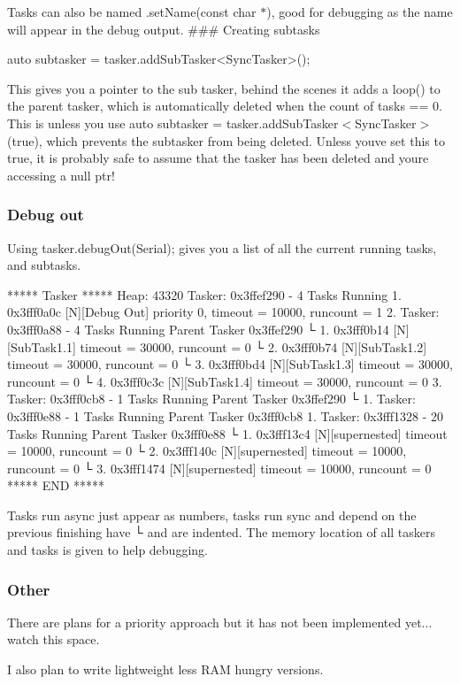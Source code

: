 Tasks can also be named {\ttfamily .set\+Name(const char $\ast$)}, good for debugging as the name will appear in the debug output. \#\#\# Creating subtasks 
\begin{DoxyCode}
auto subtasker = tasker.addSubTasker<SyncTasker>();
\end{DoxyCode}
 This gives you a pointer to the sub tasker, behind the scenes it adds a loop() to the parent tasker, which is automatically deleted when the count of tasks == 0. This is unless you use {\ttfamily auto subtasker = tasker.\+add\+Sub\+Tasker$<$Sync\+Tasker$>$(true)}, which prevents the subtasker from being deleted. Unless you\textquotesingle{}ve set this to true, it is probably safe to assume that the tasker has been deleted and you\textquotesingle{}re accessing a null ptr!

\subsubsection*{Debug out}

Using {\ttfamily tasker.\+debug\+Out(\+Serial);} gives you a list of all the current running tasks, and subtasks. 
\begin{DoxyCode}
*****  Tasker  *****  
Heap: 43320
Tasker: 0x3ffef290 - 4 Tasks Running
    1. 0x3fff0a0c [N][Debug Out] priority 0, timeout = 10000, runcount = 1
    2. Tasker: 0x3fff0a88 - 4 Tasks Running Parent Tasker 0x3ffef290
       └ 1. 0x3fff0b14 [N][SubTask1.1] timeout = 30000, runcount = 0
        └ 2. 0x3fff0b74 [N][SubTask1.2] timeout = 30000, runcount = 0
         └ 3. 0x3fff0bd4 [N][SubTask1.3] timeout = 30000, runcount = 0
          └ 4. 0x3fff0c3c [N][SubTask1.4] timeout = 30000, runcount = 0
    3. Tasker: 0x3fff0cb8 - 1 Tasks Running Parent Tasker 0x3ffef290
        └ 1. Tasker: 0x3fff0e88 - 1 Tasks Running Parent Tasker 0x3fff0cb8
            1. Tasker: 0x3fff1328 - 20 Tasks Running Parent Tasker 0x3fff0e88
               └ 1. 0x3fff13c4 [N][supernested] timeout = 10000, runcount = 0
                └ 2. 0x3fff140c [N][supernested] timeout = 10000, runcount = 0
                 └ 3. 0x3fff1474 [N][supernested] timeout = 10000, runcount = 0
*****   END   *****
\end{DoxyCode}
 Tasks run async just appear as numbers, tasks run sync and depend on the previous finishing have └ and are indented. The memory location of all taskers and tasks is given to help debugging.

\subsubsection*{Other}


\begin{DoxyItemize}
\item There are plans for a priority approach but it has not been implemented yet... watch this space.
\item I also plan to write lightweight less R\+AM hungry versions. 
\end{DoxyItemize}